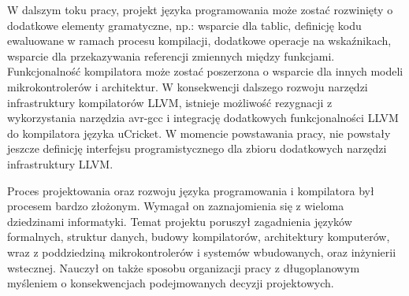 W dalszym toku pracy, projekt języka programowania może zostać rozwinięty o dodatkowe elementy gramatyczne, np.: wsparcie dla tablic, definicję kodu ewaluowane w ramach procesu kompilacji, dodatkowe operacje na wskaźnikach, wsparcie dla przekazywania referencji zmiennych między funkcjami.
Funkcjonalność kompilatora może zostać poszerzona o wsparcie dla innych modeli mikrokontrolerów i architektur. W konsekwencji dalszego rozwoju narzędzi infrastruktury kompilatorów LLVM, istnieje możliwość rezygnacji z wykorzystania narzędzia avr-gcc i integrację dodatkowych funkcjonalności LLVM do kompilatora języka uCricket. W momencie powstawania pracy, nie powstały jeszcze definicję interfejsu programistycznego dla zbioru dodatkowych narzędzi infrastruktury LLVM.

Proces projektowania oraz rozwoju języka programowania i kompilatora był procesem bardzo złożonym. Wymagał on zaznajomienia się z wieloma dziedzinami informatyki. Temat projektu poruszył zagadnienia języków formalnych, struktur danych, budowy kompilatorów, architektury komputerów, wraz z poddziedziną mikrokontrolerów i systemów wbudowanych, oraz inżynierii wstecznej. Nauczył on także sposobu organizacji pracy z długoplanowym myśleniem o konsekwencjach podejmowanych decyzji projektowych.

